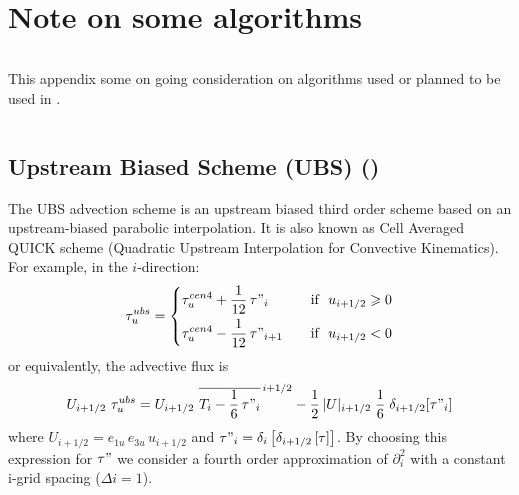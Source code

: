 \documentclass[../tex_main/NEMO_manual]{subfiles}
\begin{document}
\chapter{Note on some algorithms}
\label{apdx:E}
\minitoc

\newpage
$\ $\newline    %

This appendix some on going consideration on algorithms used or planned to be used in \NEMO. 

$\ $\newline    %

\section{Upstream Biased Scheme (UBS) (\protect{})}
\label{sec:TRA_adv_ubs}

The UBS advection scheme is an upstream biased third order scheme based on
an upstream-biased parabolic interpolation.
It is also known as Cell Averaged QUICK scheme (Quadratic Upstream Interpolation for Convective Kinematics).
For example, in the $i$-direction:
\begin{equation} \label{eq:tra_adv_ubs2}
\tau _u^{ubs} = \left\{	 \begin{aligned}
  & \tau _u^{cen4} + \frac{1}{12} \,\tau"_i	   & \quad \text{if }\ u_{i+1/2} \geqslant 0 \\
  & \tau _u^{cen4} - \frac{1}{12} \,\tau"_{i+1} & \quad \text{if }\ u_{i+1/2}       <       0
  						 \end{aligned}    \right.
\end{equation}
or equivalently, the advective flux is
\begin{equation} \label{eq:tra_adv_ubs2}
U_{i+1/2} \ \tau _u^{ubs} 
=U_{i+1/2} \ \overline{ T_i - \frac{1}{6}\,\tau"_i }^{\,i+1/2}
- \frac{1}{2}\, |U|_{i+1/2} \;\frac{1}{6} \;\delta_{i+1/2}[\tau"_i]
\end{equation}
where $U_{i+1/2} = e_{1u}\,e_{3u}\,u_{i+1/2}$ and
$\tau "_i =\delta _i \left[ {\delta _{i+1/2} \left[ \tau \right]} \right]$.
By choosing this expression for $\tau "$ we consider a fourth order approximation of $\partial_i^2$ with
a constant i-grid spacing ($\Delta i=1$).
\end{document}
